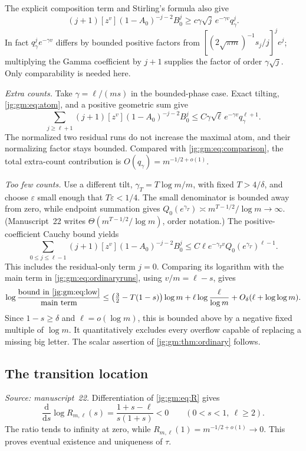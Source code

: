 \documentclass[11pt,a4paper]{article}
\theoremstyle{definition}\newaliascnt{definition}{theorem}
\theoremstyle{remark}\newaliascnt{remark}{theorem}
\newcommand{\dd}{\mathrm d}
\begin{document}
The explicit composition term and Stirling's formula also give
\begin{equation}\label{jg:gm:eq:comparison}
 (j+1)[z^v](1-A_0)^{-j-2}B_0^j
 \ge c\gamma\sqrt j\,e^{-\gamma v}q_\gamma^j .
\end{equation}
In fact $q_\gamma^je^{-\gamma v}$ differs by bounded positive factors from
$[(2\sqrt{\pi m})^{-1}s_j/j]^je^j$; multiplying the Gamma coefficient by $j+1$
supplies the factor of order $\gamma\sqrt j$. Only comparability is needed here.

\emph{Extra counts.} Take $\gamma=\ell/(ms)$ in the bounded-phase case. Exact
tilting, \eqref{jg:gm:eq:atom}, and a positive geometric sum give
\[
 \sum_{j\ge\ell+1}(j+1)[z^v](1-A_0)^{-j-2}B_0^j
 \le C\gamma\sqrt\ell\,e^{-\gamma v}q_\gamma^{\ell+1}.
\]
The normalized two residual runs do not increase the maximal atom, and their
normalizing factor stays bounded. Compared with \eqref{jg:gm:eq:comparison}, the
total extra-count contribution is $O(q_\gamma)=m^{-1/2+o(1)}$.

\emph{Too few counts.} Use a different tilt, $\gamma_T=T\log m/m$, with fixed
$T>4/\delta$, and choose $\varepsilon$ small enough that $T\varepsilon<1/4$. The
small denominator is bounded away from zero, while endpoint summation gives
$Q_0(e^{\gamma_T})\asymp m^{T-1/2}/\log m\to\infty$. (Manuscript~22 writes
$\Theta(m^{T-1/2}/\log m)$, order notation.) The positive-coefficient Cauchy
bound yields
\begin{equation}\label{jg:gm:eq:low}
 \sum_{0\le j\le\ell-1}(j+1)[z^v](1-A_0)^{-j-2}B_0^j
 \le C\ell e^{-\gamma_Tv}Q_0(e^{\gamma_T})^{\ell-1}.
\end{equation}
This includes the residual-only term $j=0$. Comparing its logarithm with the
main term in \eqref{jg:gm:eq:ordinaryruns}, using $v/m=\ell-s$, gives
\begin{equation}\label{jg:gm:eq:lowratio}
 \log\frac{\text{bound in \eqref{jg:gm:eq:low}}}{\text{main term}}
 \le\bigl(\tfrac32-T(1-s)\bigr)\log m
       +\ell\log\frac{\ell}{\log m}
       +O_\delta(\ell+\log\log m).
\end{equation}
Since $1-s\ge\delta$ and $\ell=o(\log m)$, this is bounded above by a negative
fixed multiple of $\log m$. It quantitatively excludes every overflow capable of
replacing a missing big letter. The scalar assertion of
\cref{jg:gm:thm:ordinary} follows.

\subsection{The transition location}
\label{jg:sec:gm-tau}
\emph{Source: manuscript~22.} Differentiation of \eqref{jg:gm:eq:R} gives
\[
 \frac{\dd}{\dd s}\log R_{m,\ell}(s)
 =\frac{1+s-\ell}{s(1+s)}<0
 \qquad(0<s<1,\ \ell\ge2).
\]
The ratio tends to infinity at zero, while $R_{m,\ell}(1)=m^{-1/2+o(1)}\to0$.
This proves eventual existence and uniqueness of $\tau$.
\end{document}
